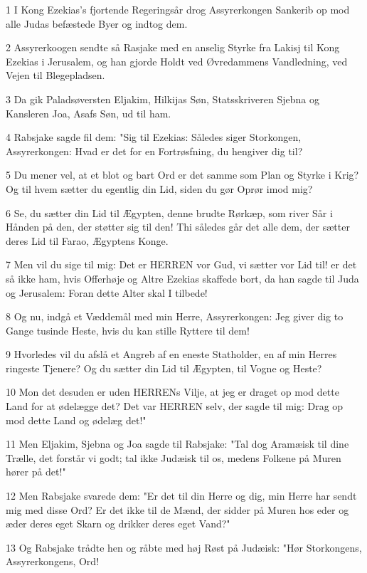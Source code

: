 \par 1 I Kong Ezekias's fjortende Regeringsår drog Assyrerkongen Sankerib op mod alle Judas befæstede Byer og indtog dem.
\par 2 Assyrerkoogen sendte så Rasjake med en anselig Styrke fra Lakisj til Kong Ezekias i Jerusalem, og han gjorde Holdt ved Øvredammens Vandledning, ved Vejen til Blegepladsen.
\par 3 Da gik Paladsøversten Eljakim, Hilkijas Søn, Statsskriveren Sjebna og Kansleren Joa, Asafs Søn, ud til ham.
\par 4 Rabsjake sagde fil dem: "Sig til Ezekias: Således siger Storkongen, Assyrerkongen: Hvad er det for en Fortrøsfning, du hengiver dig til?
\par 5 Du mener vel, at et blot og bart Ord er det samme som Plan og Styrke i Krig? Og til hvem sætter du egentlig din Lid, siden du gør Oprør imod mig?
\par 6 Se, du sætter din Lid til Ægypten, denne brudte Rørkæp, som river Sår i Hånden på den, der støtter sig til den! Thi således går det alle dem, der sætter deres Lid til Farao, Ægyptens Konge.
\par 7 Men vil du sige til mig: Det er HERREN vor Gud, vi sætter vor Lid til! er det så ikke ham, hvis Offerhøje og Altre Ezekias skaffede bort, da han sagde til Juda og Jerusalem: Foran dette Alter skal I tilbede!
\par 8 Og nu, indgå et Væddemål med min Herre, Assyrerkongen: Jeg giver dig to Gange tusinde Heste, hvis du kan stille Ryttere til dem!
\par 9 Hvorledes vil du afslå et Angreb af en eneste Statholder, en af min Herres ringeste Tjenere? Og du sætter din Lid til Ægypten, til Vogne og Heste?
\par 10 Mon det desuden er uden HERRENs Vilje, at jeg er draget op mod dette Land for at ødelægge det? Det var HERREN selv, der sagde til mig: Drag op mod dette Land og ødelæg det!"
\par 11 Men Eljakim, Sjebna og Joa sagde til Rabsjake: "Tal dog Aramæisk til dine Trælle, det forstår vi godt; tal ikke Judæisk til os, medens Folkene på Muren hører på det!"
\par 12 Men Rabsjake svarede dem: "Er det til din Herre og dig, min Herre har sendt mig med disse Ord? Er det ikke til de Mænd, der sidder på Muren hos eder og æder deres eget Skarn og drikker deres eget Vand?"
\par 13 Og Rabsjake trådte hen og råbte med høj Røst på Judæisk: "Hør Storkongens, Assyrerkongens, Ord!
